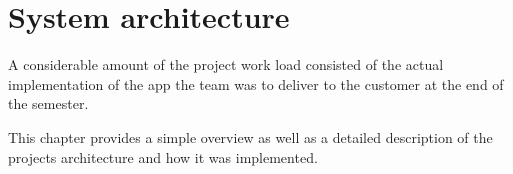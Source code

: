 \chapter{System architecture}
A considerable amount of the project work load consisted of the actual implementation of the app the team was to deliver to the customer at the end of the semester. 

This chapter provides a simple overview as well as a detailed description of the projects architecture and how it was implemented. 





